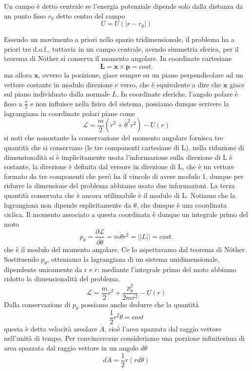 \documentclass[
10pt, %
a4paper, %
oneside, %
headinclude,footinclude, %
BCOR5mm, %
]{scrartcl}
\begin{document}
\begin{definizione}
	Un campo è detto centrale se l'energia potenziale dipende solo dalla distanza da un punto fisso \(r_0\) detto centro del campo
	\[U = U(|r-r_0|)\]
\end{definizione}
Essendo un movimento a priori nello spazio tridimensionale, il problema ha a priori tre d.o.f., tuttavia in un campo centrale, avendo simmetria sferica, per il teorema di N\"{o}ther si conserva il momento angolare. In coordinate cartesiane
\[\mathbf{L} = \mathbf{x}\times \mathbf{p} = cost.\]
ma allora \(\mathbf{x}\), ovvero la posizione, giace sempre su un piano perpendicolare ad un vettore costante in modulo direzione e verso, che è equivalente a dire che \(\mathbf{x}\) giace sul piano individuato dalla normale \(\hat{L}\). In coordinate sferiche, l'angolo polare è fisso a $\frac{\pi}{2}$ e non influisce nella fisica del sistema, possiamo dunque scrivere la lagrangiana in coordinate polari piane come
\[\mathcal{L} = \frac{m}{2}(\dot{r}^2+\dot{\theta}^2r^2)-U(r)\]
si noti che nonostante la conservazione del momento angolare fornisca tre quantità che si conservano (le tre componenti cartesiane di L), nella riduzione di dimensionalità si è implicitamente usata l'informazione sulla direzione di L è costante, la direzione è definita dal versore in direzione di L, che è un vettore formato da tre componenti che però ha il vincolo di avere modulo 1, dunque per ridurre la dimensione del problema abbiamo usato due informazioni. La terza quantità conservata che è ancora utilizzabile è il modulo di L. Notiamo che la lagrangiana non dipende esplicitamente da $\theta$, che dunque è una coordinata ciclica. Il momento associato a questa coordinata è dunque un integrale primo del moto
\[p_{\theta} = \frac{\partial \mathcal{L}}{\partial \dot{\theta}} = m\dot{\theta} r^2 = ||L|| =cost. \]
che è il modulo del momento angolare. Ce lo aspettavamo dal teorema di N\"{o}ther. Sostituendo \(p_{\theta}\), otteniamo la lagrangiana di un sistema unidimensionale, dipendente unicamente da r e $\dot{r}$: mediante l'integrale primo del moto abbiamo ridotto la dimensionalità del problema.
\[\mathcal{L} = \frac{m}{2}\dot{r}^2 + \frac{p_{\theta}^2 }{2mr^2}-U(r) \]
Dalla conservazione di \(p_{\theta}\) possiamo anche dedurre che la quantità
\[\frac{1}{2}r^2\dot{\theta} = cost\]
questa è detta velocità areolare $\dot{A}$, cioè l'area spazzata dal raggio vettore nell'unità di tempo. Per convincercene consideriamo una porzione infinitesima di area spazzata dal raggio vettore in un angolo $d\theta$
\[dA = \frac{1}{2}r(rd\theta)\]
\end{document}
